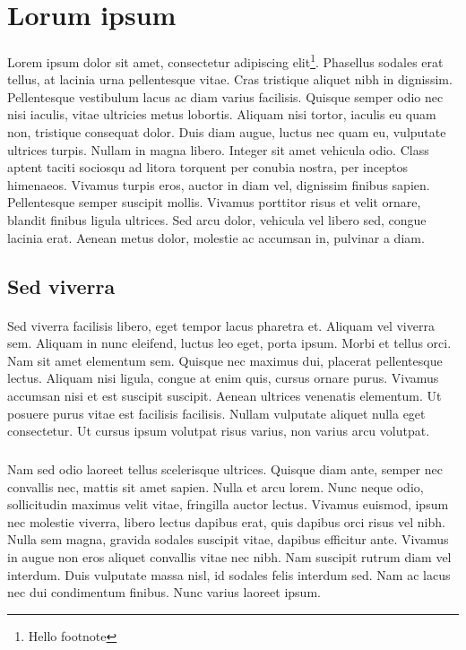 \documentclass[a4paper]{article}
\begin{document}
\tableofcontents{}

\section{Lorum ipsum}

\paragraph{}
Lorem ipsum dolor sit amet, consectetur adipiscing elit\footnote{\label{myfootnote}Hello footnote}. Phasellus sodales erat tellus, at lacinia urna pellentesque vitae. Cras tristique aliquet nibh in dignissim. Pellentesque vestibulum lacus ac diam varius facilisis. Quisque semper odio nec nisi iaculis, vitae ultricies metus lobortis. Aliquam nisi tortor, iaculis eu quam non, tristique consequat dolor. Duis diam augue, luctus nec quam eu, vulputate ultrices turpis. Nullam in magna libero. Integer sit amet vehicula odio. Class aptent taciti sociosqu ad litora torquent per conubia nostra, per inceptos himenaeos. Vivamus turpis eros, auctor in diam vel, dignissim finibus sapien. Pellentesque semper suscipit mollis. Vivamus porttitor risus et velit ornare, blandit finibus ligula ultrices. Sed arcu dolor, vehicula vel libero sed, congue lacinia erat. Aenean metus dolor, molestie ac accumsan in, pulvinar a diam.

\subsection{Sed viverra}

\paragraph{}
Sed viverra facilisis libero, eget tempor lacus pharetra et. Aliquam vel viverra sem. Aliquam in nunc eleifend, luctus leo eget, porta ipsum. Morbi et tellus orci. Nam sit amet elementum sem. Quisque nec maximus dui, placerat pellentesque lectus. Aliquam nisi ligula, congue at enim quis, cursus ornare purus. Vivamus accumsan nisi et est suscipit suscipit. Aenean ultrices venenatis elementum. Ut posuere purus vitae est facilisis facilisis. Nullam vulputate aliquet nulla eget consectetur. Ut cursus ipsum volutpat risus varius, non varius arcu volutpat.

\subparagraph{}
Nam sed odio laoreet tellus scelerisque ultrices. Quisque diam ante, semper nec convallis nec, mattis sit amet sapien. Nulla et arcu lorem. Nunc neque odio, sollicitudin maximus velit vitae, fringilla auctor lectus. Vivamus euismod, ipsum nec molestie viverra, libero lectus dapibus erat, quis dapibus orci risus vel nibh. Nulla sem magna, gravida sodales suscipit vitae, dapibus efficitur ante. Vivamus in augue non eros aliquet convallis vitae nec nibh. Nam suscipit rutrum diam vel interdum. Duis vulputate massa nisl, id sodales felis interdum sed. Nam ac lacus nec dui condimentum finibus. Nunc varius laoreet ipsum.
\end{document}
